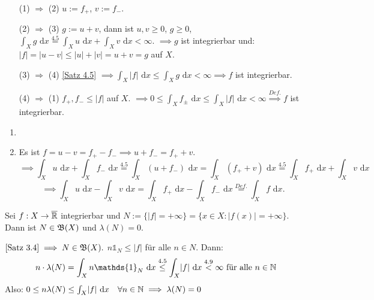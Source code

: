 \documentclass[a4paper,twoside,DIV15,BCOR12mm,chapterprefix=true,headings=onelinechapter]{scrbook}
\begin{document}
\begin{beweis}
\begin{enumerate}
 \item[(1) $\Rightarrow$ (2)] $u:= f_+$, $v := f_-$.
 \item[(2) $\Rightarrow$ (3)] $g := u+v$, dann ist $u,v \geq 0$, $g \geq 0$, $\int_X g \text{ d}x \stackrel{4.5}{=} \int_X u \text{ d}x + \int_X v \text{ d}x < \infty$. $\implies g$ ist integrierbar und: $|f| = |u-v| \leq |u| + |v| = u+v = g$ auf $X$.
 \item[(3) $\Rightarrow$ (4)] \ref{Satz 4.5} $\implies \int_X |f| \text{ d}x \leq \int_X g \text{ d}x < \infty \implies f$ ist integrierbar.
 \item[(4) $\Rightarrow$ (1)] $f_+, f_- \leq |f|$ auf $X$. $\implies 0 \leq \int_X f_\pm \text{ d}x \leq \int_X |f| \text{ d}x < \infty \stackrel{Def.}{\implies} f$ ist integrierbar.
\end{enumerate}
\end{beweis}

\begin{beweis}
\begin{enumerate}
 \item \checkmark
 \item Es ist $f = u-v = f_+ - f_- \implies u+f_- = f_+ + v$.
\[\implies \int_X u \text{ d}x + \int_X f_- \text{ d}x \stackrel{4.5}{=} \int_X (u+ f_-) \text{ d}x = \int_X (f_+ + v) \text{ d}x \stackrel{4.5}{=} \int_X f_+ \text{ d}x + \int_X v \text{ d}x\]
\[\implies \int_X u \text{ d}x - \int_X v \text{ d}x = \int_X f_+ \text{ d}x - \int_X f_- \text{ d}x \stackrel{Def.}{=} \int_X f \text{ d}x. \]
\end{enumerate}
\end{beweis}

\begin{folgerungen}
\label{Folgerung 4.10}
\label{Satz 4.10}
Sei $f:X\to\overline{\mathbb{R}}$ integrierbar und $N := \{\lvert f \rvert = +\infty\} = \{x\in X : \lvert f(x) \rvert = + \infty\}$. Dann ist $N\in \mathfrak{B}(X)$ und $\lambda(N) = 0$.
\end{folgerungen}

\begin{beweis}
 $\ref{Satz 3.4} \implies N \in \mathfrak{B}(X).$ $n\mathds{1}_N \leq \lvert f \rvert$ für alle $n\in N$. Dann: 
\[n \cdot \lambda(N) = \int_X n\mathds{1}_N \text{ d}x \stackrel{4.5}{\leq} \int_X \lvert f \rvert \text{ d}x \stackrel{4.9}{<} \infty \text{  für alle } n \in \mdn\]
Also: $0 \leq n\lambda(N) \leq \int_X \lvert f \rvert \text{ d}x \quad \forall n \in \mathbb{N} \implies \lambda(N) = 0$ 
\end{beweis}
\end{document}

